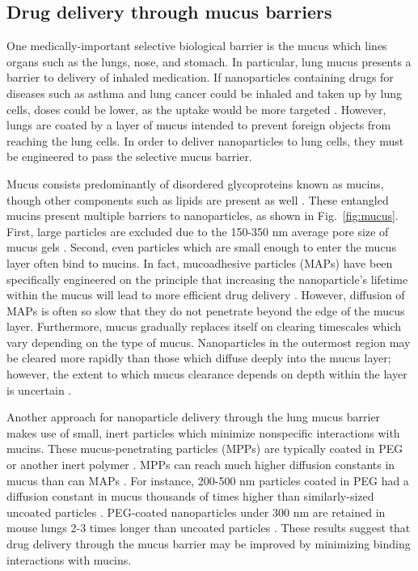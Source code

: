 \subsection{Drug delivery through mucus barriers}
\label{sec:mucus}

One medically-important selective biological barrier is the mucus which lines organs such as the lungs, nose, and stomach.  In particular, lung mucus presents a barrier to delivery of inhaled medication.  If nanoparticles containing drugs for diseases such as asthma and lung cancer could be inhaled and taken up by lung cells, doses could be lower, as the uptake would be more targeted \cite{carlson18,schneider17}.  However, lungs are coated by a layer of mucus intended to prevent foreign objects from reaching the lung cells.  In order to deliver nanoparticles to lung cells, they must be engineered to pass the selective mucus barrier.

Mucus consists predominantly of disordered glycoproteins known as mucins, though other components such as lipids are present as well \cite{witten17}.  These entangled mucins present multiple barriers to nanoparticles, as shown in Fig.~\ref{fig:mucus}.  First, large particles are excluded due to the 150-350 nm average pore size of mucus gels \cite{lai10,lai11}.  Second, even particles which are small enough to enter the mucus layer often bind to mucins.  In fact, mucoadhesive particles (MAPs) have been specifically engineered on the principle that increasing the nanoparticle's lifetime within the mucus will lead to more efficient drug delivery \cite{peppas85}.  However, diffusion of MAPs is often so slow that they do not penetrate beyond the edge of the mucus layer.  Furthermore, mucus gradually replaces itself on clearing timescales which vary depending on the type of mucus.  Nanoparticles in the outermost region may be cleared more rapidly than those which diffuse deeply into the mucus layer; however, the extent to which mucus clearance depends on depth within the layer is uncertain \cite{shang19,lay03,newby18}.


Another approach for nanoparticle delivery through the lung mucus barrier makes use of small, inert particles which minimize nonspecific interactions with mucins.  These mucus-penetrating particles (MPPs) are typically coated in PEG or another inert polymer \cite{schneider17, huang17}.  MPPs can reach much higher diffusion constants in mucus than can MAPs \cite{mastorakos15,lai11,porsio18,tang09}.  For instance, 200-500 nm particles coated in PEG had a diffusion constant in mucus thousands of times higher than similarly-sized uncoated particles \cite{lai11}.  PEG-coated nanoparticles under 300 nm are retained in mouse lungs 2-3 times longer than uncoated particles \cite{schneider17}.  These results suggest that drug delivery through the mucus barrier may be improved by minimizing binding interactions with mucins.


